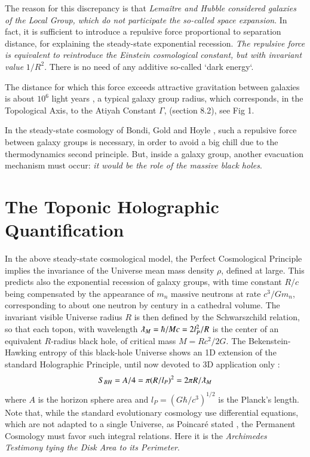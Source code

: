\documentclass[twoside,draft]{article}
\begin{document}
\begin{sloppypar}
The reason for this discrepancy is that \textit{Lema\^itre and Hubble considered galaxies of the Local Group, which do not participate the so-called space expansion}. In fact, it is sufficient to introduce a repulsive force proportional to separation distance, for explaining the steady-state exponential recession. \textit{The repulsive force is equivalent to reintroduce the Einstein cosmological constant, but with invariant value} $1/R^{2}$. There is no need of any additive so-called `dark energy`.

The distance for which this force exceeds attractive gravitation between galaxies is about $10^{6}$ light years \cite{Sanchez1}, a typical galaxy group radius, which corresponds, in the Topological Axis, to the Atiyah Constant $\Gamma$, (section 8.2), see Fig 1.

In the steady-state cosmology of Bondi, Gold and Hoyle \cite{Sanchez1}, such a repulsive force between galaxy groups is necessary, in order to avoid a big chill due to the thermodynamics second principle. But, inside a galaxy group, another evacuation mechanism must occur: \textit{it would be the role of the massive black holes}.

\section{The Toponic Holographic Quantification}

In the above steady-state cosmological model, the Perfect Cosmological Principle implies the invariance of the Universe mean mass density $\rho$, defined at large. This predicts also the exponential recession of galaxy groups, with time constant $R/c$ being compensated by the appearance of $m_n$ massive neutrons at rate $c^{3} /Gm_{n}$, 
corresponding to about one neutron by century in a cathedral volume. 
The invariant visible Universe radius $R$ is then defined by the Schwarszchild relation, so that each topon, with wavelength $\lambdabar_M = \hbar/Mc = 2l_{P}^{2} /R$ is the center of an equivalent $R$-radius black hole, of critical mass $M = Rc^{2} /2G$. The Bekenstein-Hawking entropy of this black-hole Universe shows an 1D extension \cite{Sanchez1} of the standard Holographic Principle, until now devoted to 3D application only \cite{Bousso}:
\begin{equation}
S_{BH} = A/4 = \pi(R/l_{P})^{2} = 2\pi R/\lambdabar_{M}
\end{equation}
where $A$ is the horizon sphere area and $l_{P} = (G\hbar/c^{3} )^{1/2}$ is the Planck's length. Note that, while the standard evolutionary cosmology use differential equations, which are not adapted to a single Universe, as Poincar\'{e} stated \cite{Sanchez1}, the Permanent Cosmology must favor such integral relations. Here it is the \textit{Archimedes Testimony tying the Disk Area to its Perimeter}.


\end{sloppypar}
\end{document}

